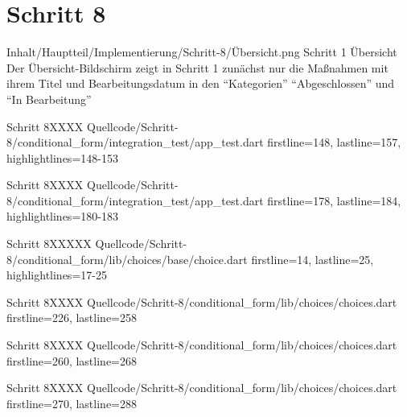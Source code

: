 \ifIncludeFigures \clearpage \fi 

\section{Schritt 8}

\begin{alexfigure}{Inhalt/Hauptteil/Implementierung/Schritt-8/Übersicht.png}
  {Schritt 1 Übersicht}
  {Der Übersicht-Bildschirm zeigt in  Schritt 1 zunächst nur die Maßnahmen mit ihrem Titel und Bearbeitungsdatum in den \enquote{Kategorien} \enquote{Abgeschlossen} und \enquote{In Bearbeitung}}

  \label{fig:Schritt1Uebersicht}

\end{alexfigure}

\ifIncludeFigures \clearpage \fi 


\begin{alexlisting}{Schritt 8}{XXXX}
    {Quellcode/Schritt-8/conditional_form/integration_test/app_test.dart}
    {firstline=148, lastline=157, highlightlines={148-153}}
    \label{lst:Schritt8XXXX}
  \end{alexlisting}

  \begin{alexlisting}{Schritt 8}{XXXX}
    {Quellcode/Schritt-8/conditional_form/integration_test/app_test.dart}
    {firstline=178, lastline=184, highlightlines={180-183}}
    \label{lst:Schritt8XXXX}
  \end{alexlisting}


  \begin{alexlisting}{Schritt 8}{XXXXX}
    {Quellcode/Schritt-8/conditional_form/lib/choices/base/choice.dart}
    {firstline=14, lastline=25, highlightlines={17-25}}
    \label{lst:Schritt4XXXXX}
  \end{alexlisting}

  \begin{alexlisting}{Schritt 8}{XXXX}
    {Quellcode/Schritt-8/conditional_form/lib/choices/choices.dart}
    {firstline=226, lastline=258}
    \label{lst:Schritt8XXXX}
  \end{alexlisting}

  \begin{alexlisting}{Schritt 8}{XXXX}
    {Quellcode/Schritt-8/conditional_form/lib/choices/choices.dart}
    {firstline=260, lastline=268}
    \label{lst:Schritt8XXXX}
  \end{alexlisting}

  \begin{alexlisting}{Schritt 8}{XXXX}
    {Quellcode/Schritt-8/conditional_form/lib/choices/choices.dart}
    {firstline=270, lastline=288}
    \label{lst:Schritt8XXXX}
  \end{alexlisting}

